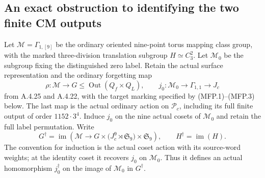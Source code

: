 \subsection{An exact obstruction to identifying the two finite CM outputs}

Let $\mathcal M=\Gamma_{1,[9]}$ be the ordinary oriented
nine-point torus mapping class group, with the marked
three-division translation subgroup $H\simeq C_3^2$.
Let $\mathcal M_0$ be the subgroup fixing the distinguished
zero label.  Retain the actual surface representation
and the ordinary forgetting map
\[
 \rho:\mathcal M\longrightarrow
       G\leq\operatorname{Out}(Q_f\times Q_L),
 \qquad
 j_0:\mathcal M_0\longrightarrow\Gamma_{1,1}
                           \longrightarrow J_c
                                                               \tag{FCD.1}
\]
from A.4.25 and A.4.22, with the target marking specified by (MFP.1)--(MFP.3) below.  The last map is the actual
ordinary action on $\mathcal P_c$, including its full
finite output of order $1152\cdot3^4$.
Induce $j_0$ on the nine actual cosets of $\mathcal M_0$
and retain the full label permutation.  Write
\[
 G^\dagger=\operatorname{im}\left(
 \mathcal M\longrightarrow
 G\times\bigl(J_c^9\rtimes\mathfrak S_9\bigr)
                    \times\mathfrak S_9\right),
 \qquad H^\dagger=\operatorname{im}(H).
                                                               \tag{FCD.2}
\]
The convention for induction is the actual coset action
with its source-word weights; at the identity coset it
recovers $j_0$ on $\mathcal M_0$.  Thus it defines an
actual homomorphism $j_0^\dagger$ on the image of
$\mathcal M_0$ in $G^\dagger$.

